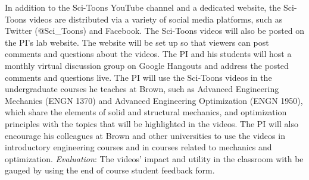 \documentclass[10pt,letterpaper]{article}
\begin{document}
    In addition to the Sci-Toons YouTube channel and a dedicated website, the Sci-Toons videos are distributed via a variety of social media platforms, such as Twitter (@Sci\_Toons) and Facebook. The Sci-Toons videos will also be posted on the PI's lab website. The website will be set up so that viewers can post comments and questions about the videos. The PI and his students will host a monthly virtual discussion group on Google Hangouts and address the posted comments and questions live. The PI will use the Sci-Toons videos in the undergraduate courses he teaches at Brown, such as Advanced Engineering Mechanics (ENGN 1370) and Advanced Engineering Optimization (ENGN 1950), which share the elements of solid and structural mechanics, and optimization principles with the topics that will be highlighted in the videos. The PI will also encourage his colleagues at Brown and other universities to use the videos in introductory engineering courses and in courses related to mechanics and optimization. \emph{Evaluation}: The videos' impact and utility in the classroom with be gauged by using the end of course student feedback form.
\end{document}
